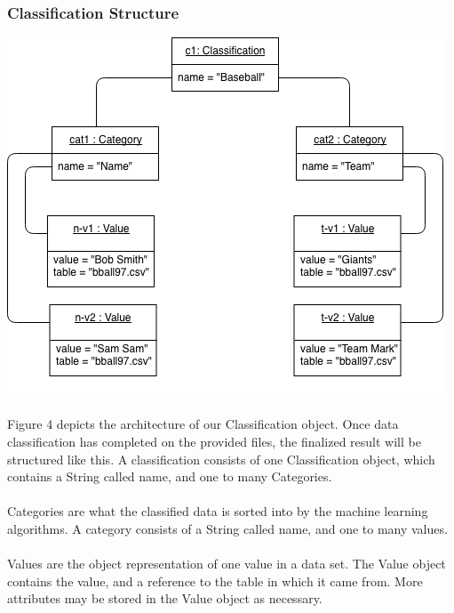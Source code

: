 \documentclass[12pt,oneside,letterpaper]{article}
\begin{document}
\subsubsection{Classification Structure}
\includegraphics[scale = 0.9]{spencer_object.png}
\begingroup
{}
\endgroup

\paragraph{} Figure 4 depicts the architecture of our Classification object. Once data classification has completed on the provided files, the finalized result will be structured like this. A classification consists of one Classification object, which contains a String called name, and one to many Categories. 
\paragraph{} Categories are what the classified data is sorted into by the machine learning algorithms. A category consists of a String called name, and one to many values.
\paragraph{} Values are the object representation of one value in a data set. The Value object contains the value, and a reference to the table in which it came from. More attributes may be stored in the Value object as necessary.
\end{document}
